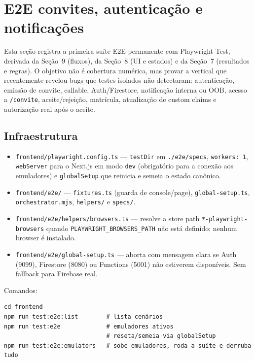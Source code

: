 \section{E2E convites, autenticação e notificações}
\label{sec:e2e-convites-auth}

Esta seção registra a primeira suíte E2E permanente com Playwright Test,
derivada da Seção~9 (fluxos), da Seção~8 (UI e estados) e da Seção~7
(resultados e regras). O objetivo não é cobertura numérica, mas provar a
vertical que recentemente revelou bugs que testes isolados não detectaram:
autenticação, emissão de convite, callable, Auth/Firestore, notificação interna
ou OOB, acesso a \texttt{/convite}, aceite/rejeição, matrícula, atualização de
custom claims e autorização real após o aceite.

\subsection{Infraestrutura}

\begin{itemize}
  \item \texttt{frontend/playwright.config.ts} --- \texttt{testDir} em
    \texttt{./e2e/specs}, \texttt{workers: 1}, \texttt{webServer} para o Next.js
    em modo \texttt{dev} (obrigatório para a conexão aos emuladores) e
    \texttt{globalSetup} que reinicia e semeia o estado canônico.
  \item \texttt{frontend/e2e/} --- \texttt{fixtures.ts} (guarda de console/page),
    \texttt{global-setup.ts}, \texttt{orchestrator.mjs}, \texttt{helpers/} e
    \texttt{specs/}.
  \item \texttt{frontend/e2e/helpers/browsers.ts} --- resolve a store path
    \texttt{*-playwright-browsers} quando \texttt{PLAYWRIGHT\_BROWSERS\_PATH} não
    está definido; nenhum browser é instalado.
  \item \texttt{frontend/e2e/global-setup.ts} --- aborta com mensagem clara se
    Auth (9099), Firestore (8080) ou Functions (5001) não estiverem disponíveis.
    Sem fallback para Firebase real.
\end{itemize}

Comandos:

\begin{verbatim}
cd frontend
npm run test:e2e:list        # lista cenários
npm run test:e2e             # emuladores ativos
                             # reseta/semeia via globalSetup
npm run test:e2e:emulators   # sobe emuladores, roda a suíte e derruba tudo
\end{verbatim}

